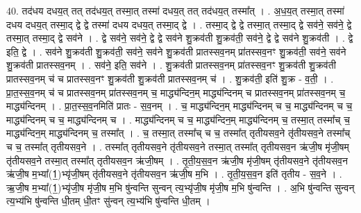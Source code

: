 \documentclass[17pt]{extarticle}
\begin{document}
40. तद॑धय दधय॒त् तत् तद॑धय॒त् तस्मा॒त् तस्मा॑ दधय॒त् तत् तद॑धय॒त् तस्मा᳚त् । . अ॒ध॒य॒त् तस्मा॒त् तस्मा॑ दधय दधय॒त् तस्मा॒द् द्वे द्वे तस्मा॑ दधय दधय॒त् तस्मा॒द् द्वे । . तस्मा॒द् द्वे द्वे तस्मा॒त् तस्मा॒द् द्वे सव॑ने॒ सव॑ने॒ द्वे तस्मा॒त् तस्मा॒द् द्वे सव॑ने । . द्वे सव॑ने॒ सव॑ने॒ द्वे द्वे सव॑ने शु॒क्रव॑ती शु॒क्रव॑ती॒ सव॑ने॒ द्वे द्वे सव॑ने शु॒क्रव॑ती । . द्वे इति॒ द्वे । . सव॑ने शु॒क्रव॑ती शु॒क्रव॑ती॒ सव॑ने॒ सव॑ने शु॒क्रव॑ती प्रातस्सव॒नम् प्रा॑तस्सव॒नꣳ शु॒क्रव॑ती॒ सव॑ने॒ सव॑ने शु॒क्रव॑ती प्रातस्सव॒नम् । . सव॑ने॒ इति॒ सव॑ने । . शु॒क्रव॑ती प्रातस्सव॒नम् प्रा॑तस्सव॒नꣳ शु॒क्रव॑ती शु॒क्रव॑ती प्रातस्सव॒नम् च॑ च प्रातस्सव॒नꣳ शु॒क्रव॑ती शु॒क्रव॑ती प्रातस्सव॒नम् च॑ । . शु॒क्रव॑ती॒ इति॑ शु॒क्र - व॒ती॒ । . प्रा॒त॒स्स॒व॒नम् च॑ च प्रातस्सव॒नम् प्रा॑तस्सव॒नम् च॒ माद्ध्य॑न्दिन॒म् माद्ध्य॑न्दिनम् च प्रातस्सव॒नम् प्रा॑तस्सव॒नम् च॒ माद्ध्य॑न्दिनम् । . प्रा॒त॒स्स॒व॒नमिति॑ प्रातः - स॒व॒नम् । . च॒ माद्ध्य॑न्दिन॒म् माद्ध्य॑न्दिनम् च च॒ माद्ध्य॑न्दिनम् च च॒ माद्ध्य॑न्दिनम् च च॒ माद्ध्य॑न्दिनम् च । . माद्ध्य॑न्दिनम् च च॒ माद्ध्य॑न्दिन॒म् माद्ध्य॑न्दिनम् च॒ तस्मा॒त् तस्मा᳚च् च॒ माद्ध्य॑न्दिन॒म् माद्ध्य॑न्दिनम् च॒ तस्मा᳚त् । . च॒ तस्मा॒त् तस्मा᳚च् च च॒ तस्मा᳚त् तृतीयसव॒ने तृ॑तीयसव॒ने तस्मा᳚च् च च॒ तस्मा᳚त् तृतीयसव॒ने । . तस्मा᳚त् तृतीयसव॒ने तृ॑तीयसव॒ने तस्मा॒त् तस्मा᳚त् तृतीयसव॒न ऋ॑जी॒ष मृ॑जी॒षम् तृ॑तीयसव॒ने तस्मा॒त् तस्मा᳚त् तृतीयसव॒न ऋ॑जी॒षम् । . तृ॒ती॒य॒स॒व॒न ऋ॑जी॒ष मृ॑जी॒षम् तृ॑तीयसव॒ने तृ॑तीयसव॒न ऋ॑जी॒ष म॒भ्या᳚(1॒)भ्यृ॑जी॒षम् तृ॑तीयसव॒ने तृ॑तीयसव॒न ऋ॑जी॒ष म॒भि । . तृ॒ती॒य॒स॒व॒न इति॑ तृतीय - स॒व॒ने । . ऋ॒जी॒ष म॒भ्या᳚(1॒)भ्यृ॑जी॒ष मृ॑जी॒ष म॒भि षु॑न्वन्ति सुन्वन् त्य॒भ्यृ॑जी॒ष मृ॑जी॒ष म॒भि षु॑न्वन्ति । . अ॒भि षु॑न्वन्ति सुन्वन् त्य॒भ्य॑भि षु॑न्वन्ति धी॒तम् धी॒तꣳ सु॑न्वन् त्य॒भ्य॑भि षु॑न्वन्ति धी॒तम् । \newline
\end{document}
